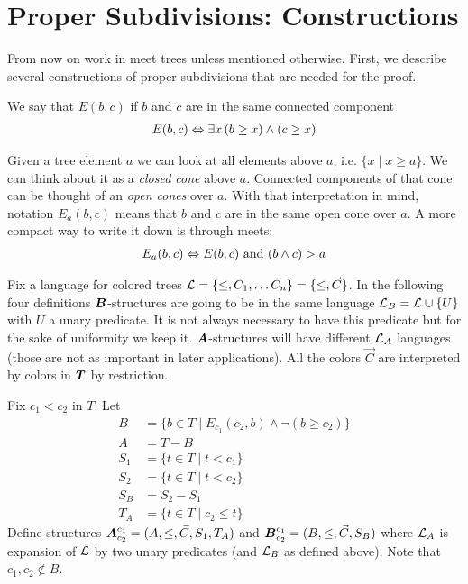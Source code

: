 \documentclass{amsart}
\DeclareMathOperator{\TT}{\boldface T}
\DeclareMathOperator{\A}{\boldface A}
\DeclareMathOperator{\B}{\boldface B}
\begin{document}
\section{Proper Subdivisions: Constructions}

From now on work in meet trees unless mentioned otherwise. First, we describe several constructions of proper subdivisions that are needed for the proof. 

\begin{Definition}
	We say that $E(b, c)$ if $b$ and $c$ are in the same connected component
	\begin{align*}
		E(b, c) \Leftrightarrow \exists x \, (b \geq x) \wedge (c \geq x)
	\end{align*}
\end{Definition}
\begin{Definition}
	Given a tree element $a$ we can look at all elements above $a$, i.e. $\{x \mid x \geq a\}$. We can think about it as a \emph{closed cone} above $a$. Connected components of that cone can be thought of an \emph{open cones} over $a$. With that interpretation in mind, notation $E_a(b, c)$ means that $b$ and $c$ are in the same open cone over $a$. A more compact way to write it down is through meets:
	\begin{align*}
		E_a(b, c) \Leftrightarrow E(b,c) \text{ and } (b \wedge c) > a
	\end{align*}
\end{Definition}

Fix a language for colored trees $\mathcal L = \{\leq, C_1, \ldots C_n\} = \{\leq, \vec C\}$. In the following four definitions $\B$-structures are going to be in the same language $\mathcal L_B = \mathcal L \cup \{U\}$ with $U$ a unary predicate. It is not always necessary to have this predicate but for the sake of uniformity we keep it. $\A$-structures will have different $\mathcal L_A$ languages (those are not as important in later applications). All the colors $\vec C$ are interpreted by colors in $\TT$ by restriction.


\begin{Definition}
	Fix $c_1 < c_2$ in $T$. Let
	\begin{align*}
		B &= \{b \in T \mid E_{c_1}(c_2, b) \wedge \neg(b \geq c_2)\} \\
		A &= T - B \\
		S_1 &= \{t \in T \mid t < c_1\} \\
		S_2 &= \{t \in T \mid t < c_2\} \\
		S_B &= S_2 - S_1 \\
		T_A &= \{t \in T \mid c_2 \leq t\}
	\end{align*}
	Define structures $\A^{c_1}_{c_2} = (A, \leq, \vec C, S_1, T_A)$ and $\B^{c_1}_{c_2} = (B, \leq, \vec C, S_B)$ where $\mathcal L_A$ is expansion of $\mathcal L$ by two unary predicates (and $\mathcal L_B$ as defined above). Note that $c_1, c_2 \notin B$.
\end{Definition}
\end{document}
